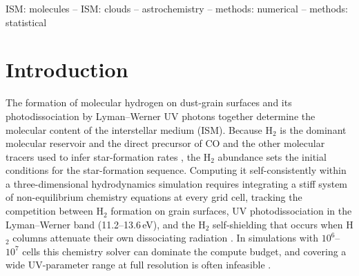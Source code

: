 \documentclass[fleqn,usenatbib]{rasti}
\begin{document}
\begin{keywords}
ISM: molecules -- ISM: clouds -- astrochemistry --
methods: numerical -- methods: statistical
\end{keywords}
\section{Introduction}
\label{sec:intro}
The formation of molecular hydrogen on dust-grain surfaces
\citep{Cazaux2004} and its photodissociation by Lyman--Werner UV photons
\citep{Habing1968,Draine1996} together determine the molecular content
of the interstellar medium (ISM). Because H\(_2\) is the dominant
molecular reservoir and the direct precursor of CO and the other
molecular tracers used to infer star-formation rates
\citep{Narayanan2012}, the H\(_2\) abundance sets the initial conditions
for the star-formation sequence. Computing it self-consistently within a
three-dimensional hydrodynamics simulation requires integrating a stiff
system of non-equilibrium chemistry equations at every grid cell,
tracking the competition between H\(_2\) formation on grain surfaces, UV
photodissociation in the Lyman--Werner band (11.2--13.6\,eV), and the
H\(_2\) self-shielding that occurs when H\(_2\) columns attenuate their own
dissociating radiation \citep{Wolcott-Green2011}. In simulations with
\(10^6\)--\(10^7\) cells this chemistry solver can dominate the compute
budget, and covering a wide UV-parameter range at full resolution is
often infeasible \citep{Grassi2014}.
\end{document}

